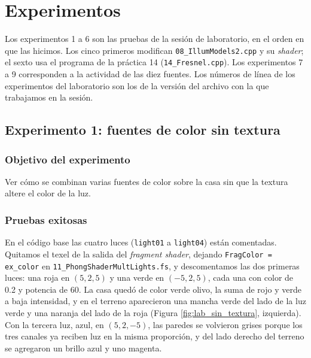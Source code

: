 
\section{Experimentos}

Los experimentos 1 a 6 son las pruebas de la sesión de laboratorio, en el orden en que las hicimos. Los cinco primeros modifican \texttt{08\_IllumModels2.cpp} y su \textit{shader}; el sexto usa el programa de la práctica 14 (\texttt{14\_Fresnel.cpp}). Los experimentos 7 a 9 corresponden a la actividad de las diez fuentes. Los números de línea de los experimentos del laboratorio son los de la versión del archivo con la que trabajamos en la sesión.

\subsection{Experimento 1: fuentes de color sin textura}

\subsubsection{Objetivo del experimento}
Ver cómo se combinan varias fuentes de color sobre la casa sin que la textura altere el color de la luz.

\subsubsection{Pruebas exitosas}
En el código base las cuatro luces (\texttt{light01} a \texttt{light04}) están comentadas. Quitamos el texel de la salida del \textit{fragment shader}, dejando \texttt{FragColor = ex\_color} en \texttt{11\_PhongShaderMultLights.fs}, y descomentamos las dos primeras luces: una roja en $(5, 2, 5)$ y una verde en $(-5, 2, 5)$, cada una con color de 0.2 y potencia de 60. La casa quedó de color verde olivo, la suma de rojo y verde a baja intensidad, y en el terreno aparecieron una mancha verde del lado de la luz verde y una naranja del lado de la roja (Figura \ref{fig:lab_sin_textura}, izquierda). Con la tercera luz, azul, en $(5, 2, -5)$, las paredes se volvieron grises porque los tres canales ya reciben luz en la misma proporción, y del lado derecho del terreno se agregaron un brillo azul y uno magenta.

